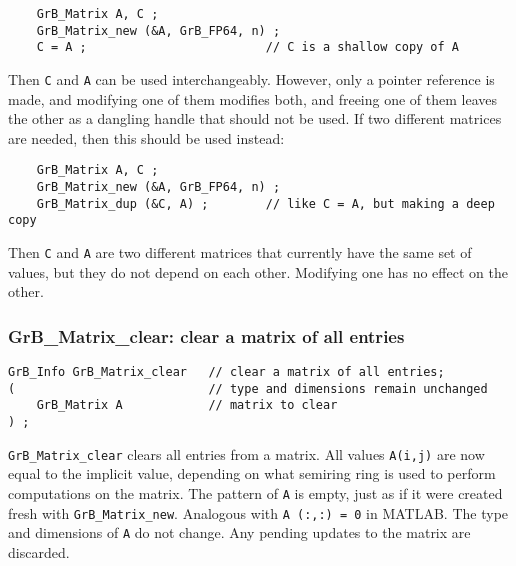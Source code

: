 \documentclass[12pt]{article}
\begin{document}
    {\footnotesize
    \begin{verbatim}
    GrB_Matrix A, C ;
    GrB_Matrix_new (&A, GrB_FP64, n) ;
    C = A ;                         // C is a shallow copy of A  \end{verbatim}}

Then \verb'C' and \verb'A' can be used interchangeably.  However, only a
pointer reference is made, and modifying one of them modifies both, and freeing
one of them leaves the other as a dangling handle that should not be used.  If
two different matrices are needed, then this should be used instead:

    {\footnotesize
    \begin{verbatim}
    GrB_Matrix A, C ;
    GrB_Matrix_new (&A, GrB_FP64, n) ;
    GrB_Matrix_dup (&C, A) ;        // like C = A, but making a deep copy \end{verbatim}}

Then \verb'C' and \verb'A' are two different matrices that currently have the
same set of values, but they do not depend on each other.  Modifying one has
no effect on the other.

\subsubsection{{\sf GrB\_Matrix\_clear:}        clear a matrix of all entries}
\label{matrix_clear}

\begin{mdframed}[userdefinedwidth=6in]
{\footnotesize
\begin{verbatim}
GrB_Info GrB_Matrix_clear   // clear a matrix of all entries;
(                           // type and dimensions remain unchanged
    GrB_Matrix A            // matrix to clear
) ;
\end{verbatim} } \end{mdframed}

\verb'GrB_Matrix_clear' clears all entries from a matrix.  All values
\verb'A(i,j)' are now equal to the implicit value, depending on what semiring
ring is used to perform computations on the matrix.  The pattern of \verb'A' is
empty, just as if it were created fresh with \verb'GrB_Matrix_new'.  Analogous
with \verb'A (:,:) = 0' in MATLAB.  The type and dimensions of \verb'A' do not
change.  Any pending updates to the matrix are discarded.
\end{document}
